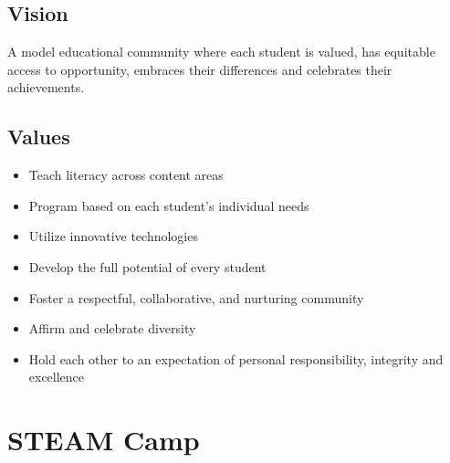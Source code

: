 \documentclass[letterpaper,10pt,english]{sphinxmanual}
\begin{document}
\subsection{Vision}
\label{philosophy:vision}
A model educational community where each student is valued, has equitable access to opportunity, embraces their differences and celebrates their achievements.


\subsection{Values}
\label{philosophy:values}\begin{itemize}
\item {} 
Teach literacy across content areas

\item {} 
Program based on each student's individual needs

\item {} 
Utilize innovative technologies

\item {} 
Develop the full potential of every student

\item {} 
Foster a respectful, collaborative, and nurturing community

\item {} 
Affirm and celebrate diversity

\item {} 
Hold each other to an expectation of personal responsibility, integrity and excellence

\end{itemize}


\section{STEAM Camp}
\label{philosophy:steam-camp}
\end{document}
